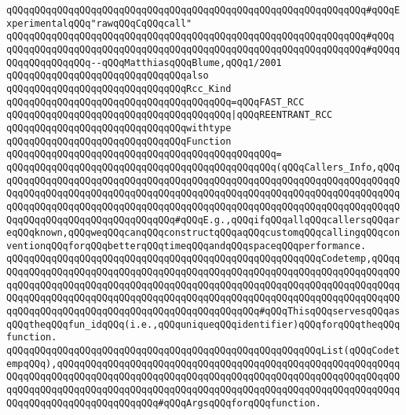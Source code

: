 \verb|qQQqqQQqqQQqqQQqqQQqqQQqqQQqqQQqqQQqqQQqqQQqqQQqqQQqqQQqqQQqqQQq#qQQqExperimentalqQQq"rawqQQqCqQQqcall"|\newline
\verb|qQQqqQQqqQQqqQQqqQQqqQQqqQQqqQQqqQQqqQQqqQQqqQQqqQQqqQQqqQQqqQQq#qQQq|\newline
\verb|qQQqqQQqqQQqqQQqqQQqqQQqqQQqqQQqqQQqqQQqqQQqqQQqqQQqqQQqqQQqqQQq#qQQqqQQqqQQqqQQqqQQq--qQQqMatthiasqQQqBlume,qQQq1/2001|\newline
\newline
\verb|qQQqqQQqqQQqqQQqqQQqqQQqqQQqqQQqalso|\newline
\verb|qQQqqQQqqQQqqQQqqQQqqQQqqQQqqQQqRcc_Kind|\newline
\verb|qQQqqQQqqQQqqQQqqQQqqQQqqQQqqQQqqQQqqQQq=qQQqFAST_RCC|\newline
\verb|qQQqqQQqqQQqqQQqqQQqqQQqqQQqqQQqqQQqqQQq|\verb#|qQQqREENTRANT_RCC#\newline
\newline
\verb|qQQqqQQqqQQqqQQqqQQqqQQqqQQqqQQqwithtype|\newline
\verb|qQQqqQQqqQQqqQQqqQQqqQQqqQQqqQQqFunction|\newline
\verb|qQQqqQQqqQQqqQQqqQQqqQQqqQQqqQQqqQQqqQQqqQQqqQQq=|\newline
\verb|qQQqqQQqqQQqqQQqqQQqqQQqqQQqqQQqqQQqqQQqqQQqqQQq(qQQqCallers_Info,qQQqqQQqqQQqqQQqqQQqqQQqqQQqqQQqqQQqqQQqqQQqqQQqqQQqqQQqqQQqqQQqqQQqqQQqqQQqqQQqqQQqqQQqqQQqqQQqqQQqqQQqqQQqqQQqqQQqqQQqqQQqqQQqqQQqqQQqqQQqqQQqqQQqqQQqqQQqqQQqqQQqqQQqqQQqqQQqqQQqqQQqqQQqqQQqqQQqqQQqqQQqqQQqqQQqqQQqqQQqqQQqqQQqqQQqqQQqqQQqqQQq#qQQqE.g.,qQQqifqQQqallqQQqcallersqQQqareqQQqknown,qQQqweqQQqcanqQQqconstructqQQqaqQQqcustomqQQqcallingqQQqconventionqQQqforqQQqbetterqQQqtimeqQQqandqQQqspaceqQQqperformance.|\newline
\verb|qQQqqQQqqQQqqQQqqQQqqQQqqQQqqQQqqQQqqQQqqQQqqQQqqQQqqQQqCodetemp,qQQqqQQqqQQqqQQqqQQqqQQqqQQqqQQqqQQqqQQqqQQqqQQqqQQqqQQqqQQqqQQqqQQqqQQqqQQqqQQqqQQqqQQqqQQqqQQqqQQqqQQqqQQqqQQqqQQqqQQqqQQqqQQqqQQqqQQqqQQqqQQqqQQqqQQqqQQqqQQqqQQqqQQqqQQqqQQqqQQqqQQqqQQqqQQqqQQqqQQqqQQqqQQqqQQqqQQqqQQqqQQqqQQqqQQqqQQqqQQqqQQqqQQqqQQqqQQqqQQq#qQQqThisqQQqservesqQQqasqQQqtheqQQqfun_idqQQq(i.e.,qQQquniqueqQQqidentifier)qQQqforqQQqtheqQQqfunction.|\newline
\verb|qQQqqQQqqQQqqQQqqQQqqQQqqQQqqQQqqQQqqQQqqQQqqQQqqQQqqQQqList(qQQqCodetempqQQq),qQQqqQQqqQQqqQQqqQQqqQQqqQQqqQQqqQQqqQQqqQQqqQQqqQQqqQQqqQQqqQQqqQQqqQQqqQQqqQQqqQQqqQQqqQQqqQQqqQQqqQQqqQQqqQQqqQQqqQQqqQQqqQQqqQQqqQQqqQQqqQQqqQQqqQQqqQQqqQQqqQQqqQQqqQQqqQQqqQQqqQQqqQQqqQQqqQQqqQQqqQQqqQQqqQQqqQQqqQQqqQQqqQQq#qQQqArgsqQQqforqQQqfunction.|\newline
